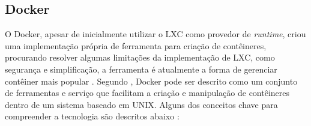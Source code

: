 \documentclass[twoside,english,brazilian]{UNISINOSartigo}
\begin{document}

\subsection{Docker}
\label{docker}

O Docker, apesar de inicialmente utilizar o LXC como provedor de \textit{runtime}, criou uma implementação própria de ferramenta para criação de contêineres, procurando resolver algumas limitações da implementação de LXC, como segurança e simplificação, a ferramenta é atualmente a forma de gerenciar contêiner mais popular \cite{Pahl2015}. Segundo \cite{NICKOLOFF2016}, Docker pode ser descrito como um conjunto de ferramentas e serviço que facilitam a criação e manipulação de contêineres dentro de um sistema baseado em UNIX.
Alguns dos conceitos chave para compreender a tecnologia são descritos abaixo \cite{whitepaperDocker2016}:  
\end{document}
